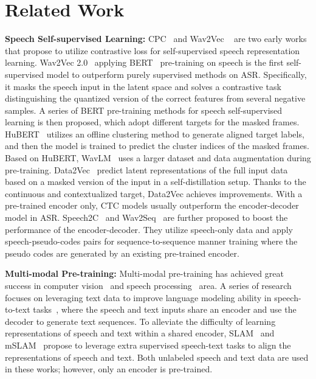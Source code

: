 \documentclass{article}
\begin{document}
 \section{Related Work}

\noindent
\textbf{Speech Self-supervised Learning:} 
CPC~\cite{oord2018representation} and Wav2Vec ~\cite{schneider2019wav2vec} are two early works that propose to utilize contrastive loss for self-supervised speech representation learning. Wav2Vec 2.0~\cite{baevski2020wav2vec} applying BERT~\cite{devlin2018bert} pre-training on speech is the first self-supervised model to outperform purely supervised methods on ASR. Specifically, it masks the speech input in the latent space and solves a contrastive task distinguishing the quantized version of the correct features from several negative samples. A series of BERT pre-training methods for speech self-supervised learning is then proposed, which adopt different targets for the masked frames.
HuBERT~\cite{hsu2021hubert} utilizes an offline clustering method to generate aligned target labels, and then the model is trained to predict the cluster indices of the masked frames. Based on HuBERT, WavLM~\cite{chen2022wavlm} uses a larger dataset and data augmentation during pre-training.
Data2Vec~\cite{baevski2022data2vec} predict latent representations of the full input data based on a masked version of the input in a self-distillation setup. Thanks to the continuous and contextualized target, Data2Vec achieves improvements. With a pre-trained encoder only, CTC models usually outperform the encoder-decoder model in ASR. Speech2C~\cite{ao2022pre} and Wav2Seq~\cite{wu2022wav2seq} are further proposed to boost the performance of the encoder-decoder. They utilize speech-only data and apply speech-pseudo-codes pairs for sequence-to-sequence manner training where the pseudo codes are generated by an existing pre-trained encoder.

\noindent
\textbf{Multi-modal Pre-training:}
Multi-modal pre-training has achieved great success in computer vision~\cite{lu2019vilbert,radford2021learning,wang2022unifying} and speech processing~\cite{bapna2021slam,ao2021speecht5,tang2022unified} area. A series of research focuses on leveraging text data to improve language modeling ability in speech-to-text tasks~\cite{han2021learning,Tang2021IST,Tang2021AGM}, where the speech and text inputs share an encoder and use the decoder to generate text sequences. To alleviate the difficulty of learning representations of speech and text within a shared encoder, SLAM~\cite{bapna2021slam} and mSLAM~\cite{bapna2022mslam} propose to leverage extra supervised speech-text tasks to align the representations of speech and text. Both unlabeled speech and text data are used in these works; however, only an encoder is pre-trained.
\end{document}
